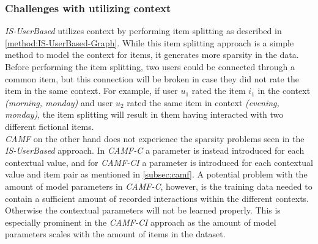 \subsubsection{Challenges with utilizing context}
\textit{IS-UserBased} utilizes context by performing item splitting as described in \autoref{method:IS-UserBased-Graph}.
While this item splitting approach is a simple method to model the context for items, it generates more sparsity in the data.
Before performing the item splitting, two users could be connected through a common item, but this connection will be broken in case they did not rate the item in the same context.
For example, if user $u_1$ rated the item $i_1$ in the context \textit{(morning, monday)} and user $u_2$ rated the same item in context \textit{(evening, monday)}, the item splitting will result in them having interacted with two different fictional items.\\
\textit{CAMF} on the other hand does not experience the sparsity problems seen in the \textit{IS-UserBased} approach.
In \textit{CAMF-C} a parameter is instead introduced for each contextual value, and for \textit{CAMF-CI} a parameter is introduced for each contextual value and item pair as mentioned in \autoref{subsec:camf}.
A potential problem with the amount of model parameters in \textit{CAMF-C}, however, is the training data needed to contain a sufficient amount of recorded interactions within the different contexts. 
Otherwise the contextual parameters will not be learned properly.
This is especially prominent in the \textit{CAMF-CI} approach as the amount of model parameters scales with the amount of items in the dataset.


